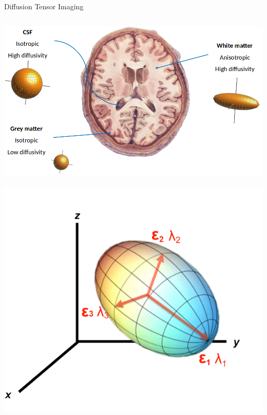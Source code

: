 \documentclass[aspectratio=169,xcolor=dvipsnames]{beamer}
\begin{document}
\begin{frame}{Diffusion Tensor Imaging}
\begin{columns}
\begin{center}
\includegraphics[width=1\textwidth]{imgs/diffusionprinciple}

\includegraphics[width=.5\textwidth]{imgs/tensor}
\end{center}



\end{columns}
\end{frame}
\end{document}
